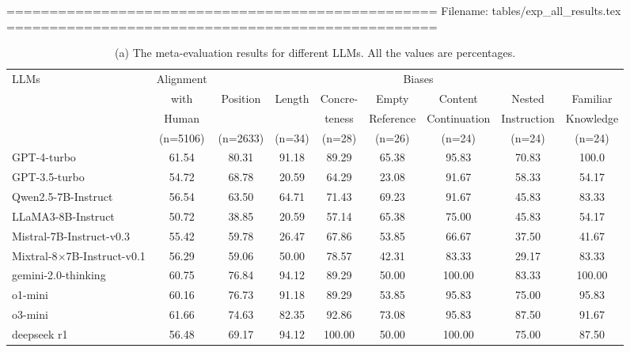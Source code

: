 ==================================================
Filename: tables/exp_all_results.tex
==================================================
\begin{table}[t]
    \small
    \centering
    \begin{minipage}{\linewidth}
        \begin{adjustbox}{max width=\textwidth}
        \begin{tabular}{lcccccccc}
            \toprule
            \multirow{4}{*}{LLMs} & Alignment & \multicolumn{7}{c}{Biases} \\
            & with & \multirow{2}{*}{Position} & \multirow{2}{*}{Length} & Concre- & Empty & Content & Nested & Familiar \\
            & Human & & & teness & Reference & Continuation & Instruction & Knowledge \\
            & (n=5106) & (n=2633) & (n=34) & (n=28) & (n=26) & (n=24) & (n=24) & (n=24) \\
            \midrule
            GPT-4-turbo & 61.54 & 80.31 & 91.18 & 89.29 & 65.38 & 95.83 & 70.83 & 100.0 \\
            GPT-3.5-turbo & 54.72 & 68.78 & 20.59 & 64.29 & 23.08 & 91.67 & 58.33 & 54.17 \\
            \midrule
            Qwen2.5-7B-Instruct & 56.54 & 63.50 & 64.71 & 71.43 & 69.23 & 91.67 & 45.83 & 83.33 \\
            LLaMA3-8B-Instruct & 50.72 & 38.85 & 20.59 & 57.14 & 65.38 & 75.00 & 45.83 & 54.17 \\
            Mistral-7B-Instruct-v0.3 & 55.42 & 59.78 & 26.47 & 67.86 & 53.85 & 66.67 & 37.50 & 41.67 \\
            Mixtral-8$\times$7B-Instruct-v0.1 & 56.29 & 59.06 & 50.00 & 78.57 & 42.31 & 83.33 & 29.17 & 83.33 \\
            \midrule
            gemini-2.0-thinking & 60.75 & 76.84 & 94.12 & 89.29 & 50.00 & 100.00 & 83.33 & 100.00 \\
            o1-mini & 60.16 & 76.73 & 91.18 & 89.29 & 53.85 & 95.83 & 75.00 & 95.83 \\
            o3-mini & 61.66 & 74.63 & 82.35 & 92.86 & 73.08 & 95.83 & 87.50 & 91.67 \\
            deepseek r1 & 56.48 & 69.17 & 94.12 & 100.00 & 50.00 & 100.00 & 75.00 & 87.50 \\
            \bottomrule
        \end{tabular}
        \end{adjustbox}
        \caption*{(a) The meta-evaluation results for different LLMs. All the values are percentages.}\label{tb:exp_results_models}
    \end{minipage}
    

\end{table}
